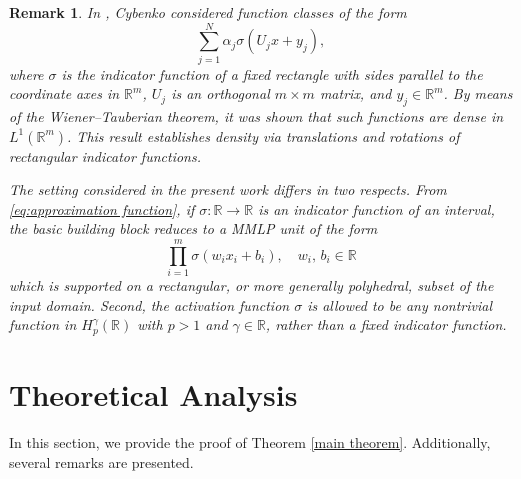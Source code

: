 \documentclass[11pt,reqno]{amsart}
\numberwithin{equation}{section}
\newtheorem{remark}[theorem]{\bf{Remark}}
\theoremstyle{remark}
\theoremstyle{definition}
\newcommand\bR{\mathbb{R}}
\newcommand\cC{\mathcal{C}}
\begin{document}
\begin{remark}
In \cite{cybenko1989approximation}, Cybenko considered function classes of the form
\[
\sum_{j=1}^{N}\alpha_j \sigma(U_j x + y_j),
\]
where $\sigma$ is the indicator function of a fixed rectangle with sides parallel to the coordinate axes in $\mathbb{R}^m$, $U_j$ is an orthogonal $m\times m$ matrix, and $y_j\in\mathbb{R}^m$.
By means of the Wiener--Tauberian theorem, it was shown that such functions are dense in
$L^1(\mathbb{R}^m)$.
This result establishes density via translations and rotations of rectangular indicator
functions.

The setting considered in the present work differs in two respects. From \eqref{eq:approximation function}, if $\sigma:\bR\to\bR$ is an indicator function of an interval, the basic building block reduces to a MMLP unit of the form
\[
\prod_{i=1}^m \sigma(w_i x_i + b_i), \quad w_i,\,b_i\in \bR
\]
which is supported on a rectangular, or more generally polyhedral, subset of the input
domain.
Second, the activation function $\sigma$ is allowed to be any nontrivial function in
$H_p^\gamma(\mathbb{R})$ with $p>1$ and $\gamma\in\bR$, rather than a fixed indicator function.
\end{remark}




\section{Theoretical Analysis}
\label{sec:theory}


In this section, we provide the proof of Theorem \ref{main theorem}. Additionally, several remarks are presented.
\end{document}
